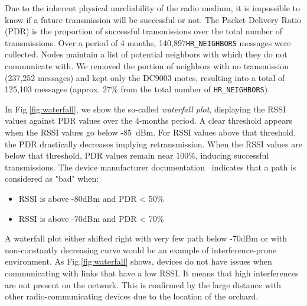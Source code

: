 \documentclass{sig-alternate}
\newcommand{\HRNEIGHBORS}    {{\tt HR\_NEIGHBORS}\xspace}
\newcommand{\HRNEIGHBORSTOTALNUMBER}     {140,897}
\begin{document}
Due to the inherent physical unreliability of the radio medium, it is impossible to know if a future transmission will be successful or not.
The Packet Delivery Ratio (PDR) is the proportion of successful transmissions over the total number of transmissions.
Over a period of 4 months, \HRNEIGHBORSTOTALNUMBER \HRNEIGHBORS messages were collected.
Nodes maintain a list of potential neighbors with which they do not communicate with.
We removed the portion of neighbors with no transmission (237,252 messages) and kept only the DC9003 motes, resulting into a total of 125,103 messages (approx. 27\% from the total number of \HRNEIGHBORS).


In Fig.\ref{fig:waterfall}, we show the so-called \textit{waterfall plot}, displaying the RSSI values against PDR values over the 4-months period.
A clear threshold appears when the RSSI values go below -85~dBm.
For RSSI values above that threshold, the PDR drastically decreases implying retransmission.
When the RSSI values are below that threshold, PDR values remain near 100\%, inducing successful transmissions.
The device manufacturer documentation~\cite{smip_app_note} indicates that a path is considered as "bad" when:

\begin{itemize}
  \item RSSI is above -80dBm and PDR < 50\%
  \item RSSI is above -70dBm and PDR < 70\%
\end{itemize}


A waterfall plot either shifted right with very few path below -70dBm or with non-constantly decreasing curve would be an example of interference-prone environment.
As Fig.\ref{fig:waterfall} shows, devices do not have issues when communicating with links that have a low RSSI.
It means that high interferences are not present on the network.
This is confirmed by the large distance with other radio-communicating devices due to the location of the orchard.
\end{document}
